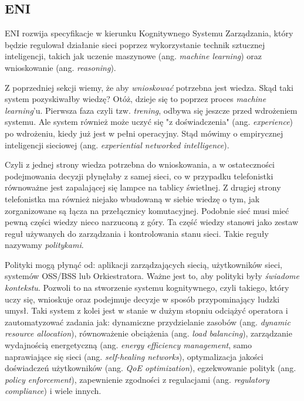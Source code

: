 \subsection{ENI}

ENI rozwija specyfikacje w kierunku Kognitywnego Systemu Zarządzania, który będzie regulował działanie sieci poprzez wykorzystanie technik sztucznej inteligencji, takich jak uczenie maszynowe (ang. \textit{machine learning}) oraz wnioskowanie (ang. \textit{reasoning}). 

Z poprzedniej sekcji wiemy, że aby \textit{wnioskować} potrzebna jest wiedza. Skąd taki system pozyskiwałby wiedzę? Otóż, dzieje się to poprzez proces \textit{machine learning}'u. Pierwsza faza czyli tzw. \textit{trening}, odbywa się jeszcze przed wdrożeniem systemu. Ale system również może uczyć się "z doświadczenia" (ang. \textit{experience}) po wdrożeniu, kiedy już jest w pełni operacyjny. Stąd mówimy o empirycznej inteligencji sieciowej (ang. \textit{experiential networked intelligence}). 

Czyli z jednej strony wiedza potrzebna do wnioskowania, a w ostateczności podejmowania decyzji płynęłaby z samej sieci, co w przypadku telefonistki równoważne jest zapalającej się lampce na tablicy świetlnej. Z drugiej strony telefonistka ma również niejako wbudowaną w siebie wiedzę o tym, jak zorganizowane są łącza na przełącznicy komutacyjnej. Podobnie sieć musi mieć pewną części wiedzy nieco narzuconą z góry. Ta część wiedzy stanowi jako zestaw reguł używanych do zarządzania i kontrolowania stanu sieci. Takie reguły nazywamy \textit{politykami}.

Polityki mogą płynąć od: aplikacji zarządzających siecią, użytkowników sieci, systemów OSS/BSS lub Orkiestratora. Ważne jest to, aby polityki były \textit{świadome kontekstu}. Pozwoli to na stworzenie systemu kognitywnego, czyli takiego, który uczy się, wnioskuje oraz podejmuje decyzje w sposób przypominający ludzki umysł. Taki system z kolei jest w stanie w dużym stopniu odciążyć operatora i zautomatyzować zadania jak: dynamiczne przydzielanie zasobów (ang. \textit{dynamic resource allocation}), równoważenie obciążenia (ang. \textit{load balancing}), zarządzanie wydajnością energetyczną (ang. \textit{energy efficiency management}, samo naprawiające się sieci (ang. \textit{self-healing networks}), optymalizacja jakości doświadczeń użytkowników (ang. \textit{QoE optimization}), egzekwowanie polityk (ang. \textit{policy enforcement}), zapewnienie zgodności z regulacjami (ang. \textit{regulatory compliance}) i wiele innych.

